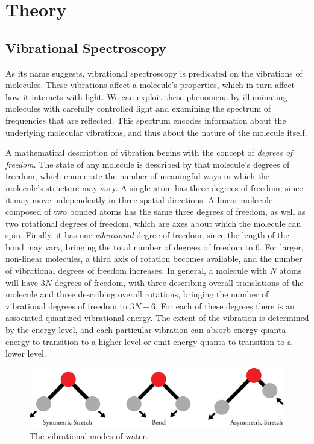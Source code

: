 \section{Theory}

\subsection{Vibrational Spectroscopy}

As its name suggests, vibrational spectroscopy is predicated on the vibrations of molecules. These vibrations affect a molecule's properties, which in turn affect how it interacts with light. We can exploit these phenomena by illuminating molecules with carefully controlled light and examining the spectrum of frequencies that are reflected. This spectrum encodes information about the underlying molecular vibrations, and thus about the nature of the molecule itself.

A mathematical description of vibration begins with the concept of \emph{degrees of freedom}. The state of any molecule is described by that molecule's degrees of freedom, which enumerate the number of meaningful ways in which the molecule's structure may vary. A single atom has three degrees of freedom, since it may move independently in three spatial directions. A linear molecule composed of two bonded atoms has the same three degrees of freedom, as well as two rotational degrees of freedom, which are axes about which the molecule can spin. Finally, it has one \emph{vibrational} degree of freedom, since the length of the bond may vary, bringing the total number of degrees of freedom to 6. For larger, non-linear molecules, a third axis of rotation becomes available, and the number of vibrational degrees of freedom increases. In general, a molecule with $N$ atoms will have $3N$ degrees of freedom, with three describing overall translations of the molecule and three describing overall rotations, bringing the number of vibrational degrees of freedom to $3N-6$. For each of these degrees there is an associated quantized vibrational energy. The extent of the vibration is determined by the energy level, and each particular vibration can absorb energy quanta energy to transition to a higher level or emit energy quanta to transition to a lower level.

\begin{figure}
	\centering
	\includegraphics[width=0.7\linewidth]{deg_freedom}
	\caption{The vibrational modes of water.}
	\label{fig:deg_freedom}
\end{figure}

